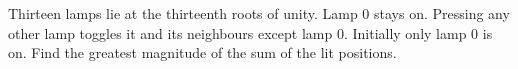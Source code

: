 Thirteen lamps lie at the thirteenth roots of unity. Lamp 0 stays on. Pressing any other lamp toggles it and its neighbours except lamp 0. Initially only lamp 0 is on. Find the greatest magnitude of the sum of the lit positions.
